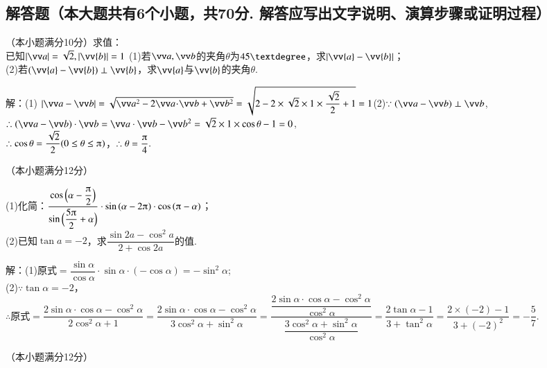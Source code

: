 \begin{exercise}
  \section{解答题（本大题共有6个小题，共70分. 解答应写出文字说明、演算步骤或证明过程）}
    \item
      （本小题满分10分）求值：\\
      已知$\abs{\vv a}=\sqrt2,\abs{\vv{\mathstrut b}}=1$
      (1)若$\vv a,\vv b$的夹角$\theta$为$45\textdegree$，求$\abs{\vv{\mathstrut a}-\vv{\mathstrut b}}$；\\
      (2)若$(\vv{\mathstrut a}-\vv{\mathstrut b})\perp \vv{\mathstrut b}$，求$\vv{\mathstrut a}$与$\vv{\mathstrut b}$的夹角$\theta$.
      \begin{answer}
        解：(1) $\abs{\vv a-\vv b}=\sqrt{\vv a^2-2\vv a\!\cdot\!\vv b+\vv b^2}=\sqrt{2-2\times\sqrt2\times1\times\dfrac{\sqrt2}2+1}=1$\fz[5]
        (2)$\because(\vv a-\vv b)\perp\vv b$,\\
        $\therefore(\vv a-\vv b)\cdot\vv b=\vv a\cdot\vv b-\vv b^2=\sqrt2\times1\times\cos\theta-1=0$,\\
        $\therefore\cos\theta=\dfrac{\sqrt2}2(0\le\theta\le\piup)$，$\therefore\theta=\dfrac{\piup}4.$\fz[10]
      \end{answer}
      \vspace{3cm}
    \item
      （本小题满分12分）\par
      (1)化简：$\dfrac{\cos{\Bigl(\alpha-\dfrac{\piup}2\Bigr)}}{\sin{\Bigl(\dfrac{5\piup}2+\alpha\Bigr)}}\cdot\sin{(\alpha-2\piup)}\cdot\cos{(\piup-\alpha)}$；\\
      (2)已知$\tan{a}=-2$，求$\dfrac{\sin{2a}-\cos^2{a}}{2+\cos{2a}}$的值.
      \begin{answer}
      解：(1)$\text{原式}=\dfrac{\sin\alpha}{\cos\alpha}\cdot\sin\alpha\cdot(-\cos\alpha)=-\sin^2\alpha$;\\
      (2)$\because\tan\alpha=-2$，
      $\therefore\text{原式}=\dfrac{2\sin\alpha\cdot\cos\alpha-\cos^2\alpha}{2\cos^2\alpha+1}
      =\dfrac{2\sin\alpha\cdot\cos\alpha-\cos^2\alpha}{3\cos^2\alpha+\sin^2\alpha}
      =\dfrac{\dfrac{2\sin\alpha\cdot\cos\alpha-\cos^2\alpha}{\cos^2\alpha}}{\dfrac{3\cos^2\alpha+\sin^2\alpha}{\cos^2\alpha}}
      =\dfrac{2\tan\alpha-1}{3+\tan^2\alpha}=\dfrac{2\times(-2)-1}{3+(-2)^2}
      =-\dfrac{5}{7}.$
      \end{answer}
    \vspace{4cm}
    \item
      （本小题满分12分）\\

\end{exercise}
